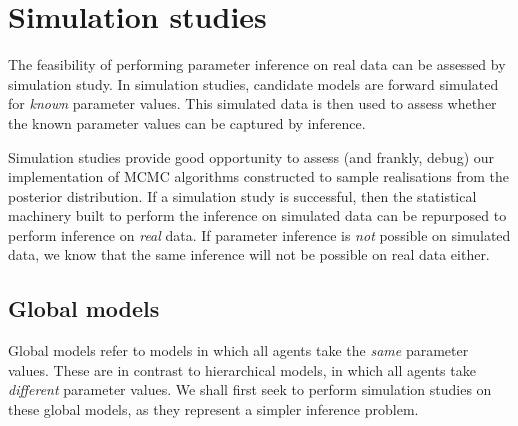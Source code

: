 \graphicspath{{fig/sim_studies/}}

\chapter{Simulation studies}
\label{cha:sim_studies}

The feasibility of performing parameter inference on real data can be assessed
by simulation study. In simulation studies, candidate models are forward
simulated for \emph{known} parameter values. This simulated data is then used
to assess whether the known parameter values can be captured by inference.

Simulation studies provide good opportunity to assess (and frankly, debug) our
implementation of MCMC algorithms constructed to sample realisations from the
posterior distribution. If a simulation study is successful, then the
statistical machinery built to perform the inference on simulated data can be
repurposed to perform inference on \emph{real} data. If parameter inference is
\emph{not} possible on simulated data, we know that the same inference will not
be possible on real data either.

\section{Global models}
\label{sec:global_models}

Global models refer to models in which all agents take the \emph{same}
parameter values. These are in contrast to hierarchical models, in which all
agents take \emph{different} parameter values. We shall first seek to perform
simulation studies on these global models, as they represent a simpler
inference problem.

